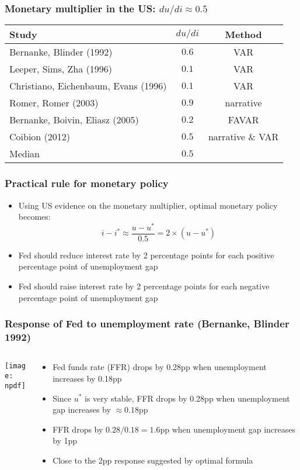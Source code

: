 \documentclass[11pt,aspectratio=169,xcolor={dvipsnames},hyperref={pdftex,pdfpagemode=UseNone,hidelinks,pdfdisplaydoctitle=true},usepdftitle=false]{beamer}
\newcommand{\npdf}{../figures/figures4.pdf}
\begin{document}
\begin{frame}
\frametitle{Monetary multiplier in the US:  $du/di \approx 0.5$}
\begin{table}
\begin{tabular*}{\textwidth}{@{\extracolsep\fill}lcc}
Study &   $du/di$ & Method \\
\toprule
Bernanke, Blinder (1992) & $0.6$ & VAR  \\
Leeper, Sims, Zha (1996) & $0.1$ & VAR \\
Christiano, Eichenbaum, Evans (1996) &  $0.1$ & VAR \\
Romer, Romer (2003)  &  $0.9$ & narrative \\
Bernanke, Boivin, Eliasz (2005) &  $0.2$ & FAVAR\\
Coibion (2012)  &  $0.5$ & narrative \& VAR \\
\midrule	
Median  &  $0.5$ &  \\
\bottomrule
\end{tabular*}
\end{table}
\end{frame}

\begin{frame}
\frametitle{Practical rule for monetary policy}
\begin{itemize}
\item Using US evidence on the monetary multiplier, optimal monetary policy becomes:
\begin{equation*}
i - i^* \approx  \frac{u-u^*}{0.5} = 2 \times (u-u^*)
\end{equation*}
\item[\then] Fed should reduce interest rate by 2 percentage points for each positive percentage point of unemployment gap
\item[\then] Fed should raise interest rate by 2 percentage points for each negative percentage point of unemployment gap
\end{itemize}	
\end{frame}

\begin{frame}
\frametitle{Response of Fed to unemployment rate (Bernanke, Blinder 1992)}
\begin{columns}
\begin{column}{0.55\textwidth}
\texttt{[image: \\npdf]}%
\end{column}
\begin{column}{0.45\textwidth}
\begin{itemize}
	\item Fed funds rate (FFR) drops by 0.28pp when unemployment increases by 0.18pp
	\item Since $u^*$ is very stable, FFR drops by 0.28pp when unemployment gap increases by $\approx 0.18$pp
	\item FFR drops by $0.28/0.18 = 1.6$pp when unemployment gap increases by 1pp
	\item Close to the 2pp response suggested by optimal formula
\end{itemize}
\end{column}  
\end{columns}
\end{frame}
\end{document}
